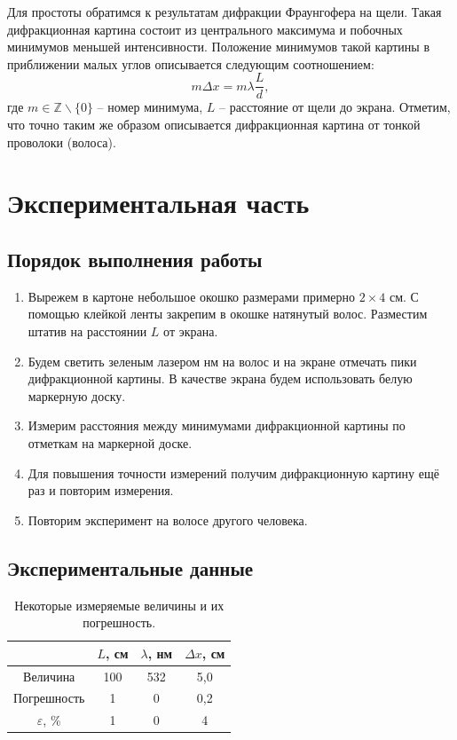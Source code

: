\documentclass[a4paper,12pt]{article} %
\begin{document}
	Для простоты обратимся к результатам дифракции Фраунгофера на щели. Такая дифракционная картина	состоит из центрального максимума и побочных минимумов меньшей интенсивности. Положение минимумов такой картины в приближении малых углов описывается следующим соотношением:
	\begin{equation*}
		\tag{$*$}
		\label{eq}
		m \Delta x = m \lambda \frac{L}{d},
	\end{equation*}
	где $m \in \mathbb{Z} \backslash \{0\}$ -- номер минимума, $L$ -- расстояние от щели до экрана. Отметим, что точно таким же образом описывается дифракционная картина от тонкой проволоки (волоса).

\section{Экспериментальная часть}
\subsection{Порядок выполнения работы}
	\begin{enumerate}
		\item
			 Вырежем в картоне небольшое окошко размерами примерно $2\times 4$ см. С помощью клейкой ленты закрепим в окошке натянутый волос. Разместим штатив на расстоянии $L$ от экрана.
		\item 
			 Будем светить зеленым лазером нм на волос и на экране отмечать пики дифракционной картины. В качестве экрана будем использовать белую маркерную доску.
		\item 
			 Измерим расстояния между минимумами дифракционной картины по отметкам на маркерной доске.
		\item	 
			 Для повышения точности измерений получим дифракционную картину ещё раз и повторим измерения.
		\item
			Повторим эксперимент на волосе другого человека. 
	\end{enumerate}

\newpage
\subsection{Экспериментальные данные}

	\begin{table}[H]
		\caption{Некоторые измеряемые величины и их погрешность.}
		\label{table:parametr}
		\begin{tabular}{|c|c|c|c|}
			\hline
			& $L$, см & $\lambda$, нм & $\Delta x$, см \\ \hline
			Величина          & 100     & 532           & 5,0            \\ \hline
			Погрешность       & 1       & 0             & 0,2            \\ \hline
			$\varepsilon$, \% & 1       & 0             & 4              \\ \hline
		\end{tabular}
	\end{table}
\end{document}
